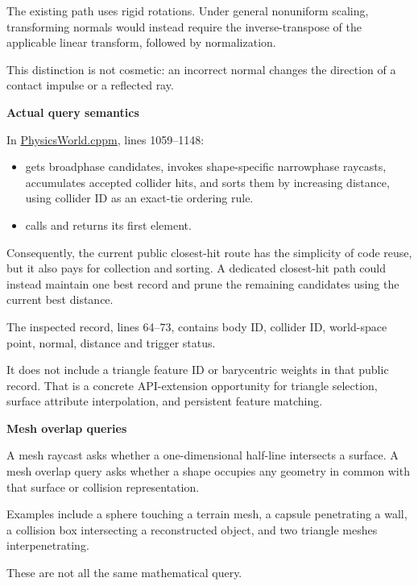The existing path uses rigid rotations. Under general nonuniform scaling, transforming normals would instead require the inverse-transpose of the applicable linear transform, followed by normalization.

This distinction is not cosmetic: an incorrect normal changes the direction of a contact impulse or a reflected ray.

\textbf{Actual query semantics}

In \href{https://github.com/swayam8624/KairoPhysicsEngine/blob/main/PhysicsWorld.cppm?utm_source=chatgpt.com}{PhysicsWorld.cppm}, lines 1059--1148:

\begin{itemize}
\tightlist
\item
   gets broadphase candidates, invokes shape-specific narrowphase raycasts, accumulates accepted collider hits, and sorts them by increasing distance, using collider ID as an exact-tie ordering rule.
\item
   calls  and returns its first element.
\end{itemize}

Consequently, the current public closest-hit route has the simplicity of code reuse, but it also pays for collection and sorting. A dedicated closest-hit path could instead maintain one best record and prune the remaining candidates using the current best distance.

The inspected  record, lines 64--73, contains body ID, collider ID, world-space point, normal, distance and trigger status.

It does not include a triangle feature ID or barycentric weights in that public record. That is a concrete API-extension opportunity for triangle selection, surface attribute interpolation, and persistent feature matching.

\textbf{Mesh overlap queries}

A mesh raycast asks whether a one-dimensional half-line intersects a surface. A mesh overlap query asks whether a shape occupies any geometry in common with that surface or collision representation.

Examples include a sphere touching a terrain mesh, a capsule penetrating a wall, a collision box intersecting a reconstructed object, and two triangle meshes interpenetrating.

These are not all the same mathematical query.

